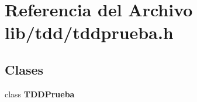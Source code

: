 \section{Referencia del Archivo lib/tdd/tddprueba.h}
\label{tddprueba_8h}
\subsection*{Clases}
\begin{DoxyCompactItemize}
\item 
class {\bf T\+D\+D\+Prueba}
\end{DoxyCompactItemize}
